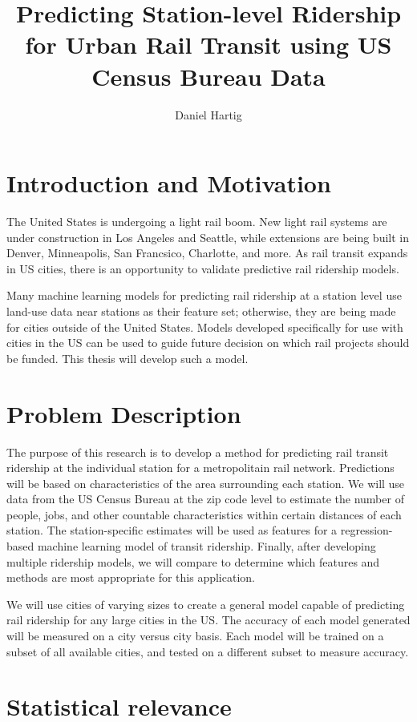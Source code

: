 \documentclass{article}
\title{Predicting Station-level Ridership for Urban Rail Transit using US Census Bureau Data}
\author{Daniel Hartig}
\begin{document}
\maketitle

\section{Introduction and Motivation}

The United States is undergoing a light rail boom. New light rail systems are under construction in Los Angeles and Seattle, while extensions are being built in Denver, Minneapolis, San Francsico, Charlotte, and more. As rail transit expands in US cities, there is an opportunity to validate predictive rail ridership models. 

Many machine learning models for predicting rail ridership at a station level use land-use data near stations as their feature set; otherwise, they are being made for cities outside of the United States. Models developed specifically for use with cities in the US can be used to guide future decision on which rail projects should be funded. This thesis will develop such a model.

\section{Problem Description}

The purpose of this research is to develop a method for predicting rail transit ridership at the individual station for a metropolitain rail network. Predictions will be based on characteristics of the area surrounding each station. We will use data from the US Census Bureau at the zip code level to estimate the number of people, jobs, and other countable characteristics within certain distances of each station. The station-specific estimates will be used as features for a regression-based machine learning model of transit ridership. Finally, after developing multiple ridership models, we will compare to determine which features and methods are most appropriate for this application. 

We will use cities of varying sizes to create a general model capable of predicting rail ridership for any large cities in the US. The accuracy of each model generated will be measured on a city versus city basis. Each model will be trained on a subset of all available cities, and tested on a different subset to measure accuracy. 

\section{Statistical relevance}
\end{document}
